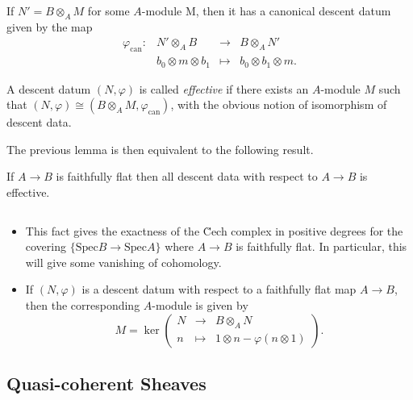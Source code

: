 If $N' = B \otimes_A M$ for some $A$-module M, then it has a canonical descent datum given by the map
$$
\begin{array}{rrcl}
 \varphi_\text{can}: & N' \otimes_A B & \to & B \otimes_A N' \\
& b_0 \otimes m \otimes b_1 & \mapsto & b_0 \otimes b_1 \otimes m.
\end{array}
$$

\begin{definition}
A descent datum $(N,\varphi)$ is called \emph{effective} if there exists an $A$-module $M$ such that $(N,\varphi) \cong (B\otimes_A M, \varphi_\text{can})$, with the obvious notion of isomorphism of descent data.
\end{definition}

The previous lemma is then equivalent to the following result.

\begin{theorem}
If $A \to B$ is faithfully flat then all descent data with respect to $A\to B$ is effective. 
\end{theorem}

\begin{remark}$ $
\begin{itemize}
\item
This fact gives the exactness of the \u Cech complex in positive degrees for the covering $\{ \text{Spec} B \to \text{Spec} A\}$ where $A \to B$ is faithfully flat. In particular, this will give some vanishing of cohomology.
\item
If $(N,\varphi)$ is a descent datum with respect to a faithfully flat map $A\to B$, then the corresponding $A$-module is given by 
$$
M = \ker \left(
\begin{array}{rcl}
N & \longrightarrow & B\otimes_A N \\
 n & \longmapsto & 1 \otimes n - \varphi(n\otimes 1)
 \end{array}
\right).
$$ 
\end{itemize}
\end{remark}

\subsection{Quasi-coherent Sheaves}

